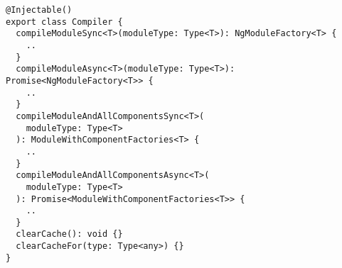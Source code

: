 \begin{verbatim}
@Injectable()
export class Compiler {
  compileModuleSync<T>(moduleType: Type<T>): NgModuleFactory<T> {
    ..
  }
  compileModuleAsync<T>(moduleType: Type<T>): Promise<NgModuleFactory<T>> {
    ..
  }
  compileModuleAndAllComponentsSync<T>(
    moduleType: Type<T>
  ): ModuleWithComponentFactories<T> {
    ..
  }
  compileModuleAndAllComponentsAsync<T>(
    moduleType: Type<T>
  ): Promise<ModuleWithComponentFactories<T>> {
    ..
  }
  clearCache(): void {}
  clearCacheFor(type: Type<any>) {}
}
\end{verbatim}
